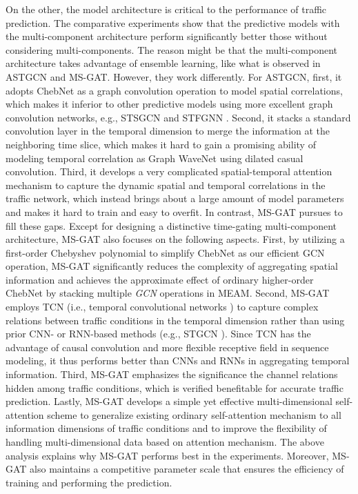 On the other, the model architecture is critical to the performance of traffic prediction. The comparative experiments show that the predictive models with the multi-component architecture perform significantly better  those without considering multi-components. The reason might be that the multi-component architecture takes advantage of ensemble learning, like what is observed in ASTGCN \cite{guo2019attention} and MS-GAT. However, they work differently. For ASTGCN, first, it adopts ChebNet \cite{defferrard2016convolutional} as a graph convolution operation to model spatial correlations, which makes it inferior to other predictive models using more excellent graph convolution networks, e.g., STSGCN \cite{song2020spatial} and STFGNN \cite{mengzhang2020spatial}. Second, it stacks a standard convolution layer in the temporal dimension to merge the information at the neighboring time slice, which makes it hard to gain a promising ability of modeling temporal correlation as Graph WaveNet \cite{wu2019graph} using dilated casual convolution. Third, it develops a very complicated spatial-temporal attention mechanism to capture the dynamic spatial and temporal correlations in the traffic network, which instead brings about a large amount of model parameters and makes it hard to train and easy to overfit. In contrast, MS-GAT pursues to fill these gaps. Except for designing a distinctive time-gating multi-component architecture, MS-GAT also focuses on the following aspects. First, by utilizing a first-order Chebyshev polynomial to simplify ChebNet \cite{defferrard2016convolutional} as our efficient GCN operation, MS-GAT  significantly reduces the complexity of aggregating spatial information and achieves the approximate effect of ordinary higher-order ChebNet by stacking multiple \textit{GCN} operations in MEAM. Second, MS-GAT employs TCN (i.e., temporal convolutional networks \cite{bai2018empirical}) to capture complex relations between traffic conditions in the temporal dimension rather than using prior CNN- or RNN-based methods (e.g., STGCN \cite{yu2017spatio}). Since TCN has the advantage of causal convolution and more flexible receptive field in sequence modeling, it thus performs better than CNNs and RNNs in aggregating temporal information. Third, MS-GAT emphasizes the significance the channel relations hidden among traffic conditions, which is verified  benefitable for accurate traffic prediction. Lastly, MS-GAT develops a simple yet effective multi-dimensional self-attention scheme to generalize existing ordinary self-attention mechanism to all information dimensions of traffic conditions and to improve the flexibility of handling multi-dimensional data based on attention mechanism. The above analysis explains why MS-GAT performs best in the experiments. Moreover, MS-GAT also maintains a competitive parameter scale that ensures the efficiency of training and performing the prediction.

